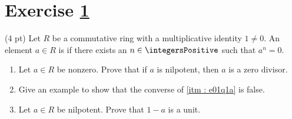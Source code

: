%
%



\section{Exercise \ref{sec : e01q1}}
\label{sec : e01q1}

(4 pt) Let $R$ be a commutative ring with a multiplicative identity $1 \neq 0$. An element $a \in R$ is  if there exists an $n \in \integersPositive$ such that $a^{n} = 0$.
\begin{enumerate}[label=(\alph*)]
\item\label{itm : e01q1a} Let $a \in R$ be nonzero. Prove that if $a$ is nilpotent, then $a$ is a zero divisor.
\item\label{itm : e01q1b} Give an example to show that the converse of \ref{itm : e01q1a} is false.
\item\label{itm : e01q1c} Let $a \in R$ be nilpotent. Prove that $1 - a$ is a unit.
\end{enumerate}

